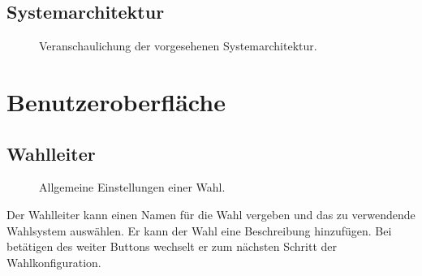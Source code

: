 \documentclass[parskip=full,11pt,twoside]{scrartcl}
\begin{document}
\subsection{Systemarchitektur}
\begin{figure}[H]
	\caption{\label{fig:sysArch}
		Veranschaulichung der vorgesehenen Systemarchitektur.
	}
\end{figure}

\section{Benutzeroberfläche}

\subsection{Wahlleiter}

\begin{figure}[H]
	\caption{\label{fig:wlltr-general}
		Allgemeine Einstellungen einer Wahl.
	}
\end{figure}
Der Wahlleiter kann einen Namen für die Wahl vergeben und das zu verwendende Wahlsystem auswählen.
Er kann der Wahl eine Beschreibung hinzufügen.
Bei betätigen des weiter Buttons wechselt er zum nächsten Schritt der Wahlkonfiguration.
\end{document}
